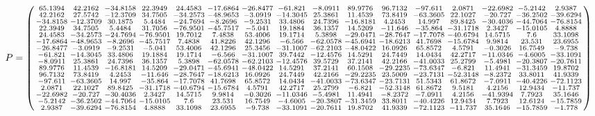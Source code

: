 \documentclass[fleqn]{article}
\begin{document}
$P = \spmqty{ 65.1394 & 42.2162 & -34.8158 & 22.3949 & 24.4583 & -17.6864 & -26.8477 & -61.821 & -8.0911 & 89.9776 & 96.7132 & -97.611 & 2.0871 & -22.6982 & -5.2142 & 2.9387 \\ 42.2162 & 27.5742 & -12.3709 & 34.7505 & -34.2573 & -48.9653 & -3.0919 & -14.3045 & 25.3861 & 11.4539 & 73.8419 & -63.3605 & 22.1027 & -20.727 & -36.2502 & -39.6294 \\ -34.8158 & -12.3709 & 30.1875 & 5.4484 & -24.7694 & -8.2696 & -9.2531 & 33.4806 & 24.7396 & -16.8181 & 4.2453 & 14.997 & 89.8425 & -30.4036 & -44.7064 & -76.8154 \\ 22.3949 & 34.7505 & 5.4484 & 31.7056 & -76.9501 & -45.7517 & -5.041 & 19.1884 & 36.1357 & 14.5209 & -11.646 & -35.864 & -31.1718 & 2.3427 & -15.0105 & 4.8888 \\ 24.4583 & -34.2573 & -24.7694 & -76.9501 & 19.7012 & 7.4838 & 53.4006 & 19.1714 & 5.3898 & -29.0471 & -28.7647 & -17.7078 & -40.6794 & 14.5715 & 7.6 & 33.1098 \\ -17.6864 & -48.9653 & -8.2696 & -45.7517 & 7.4838 & 41.8226 & 42.1296 & -6.566 & -62.0578 & -45.6941 & -18.6213 & 41.7698 & -15.6784 & 9.9814 & 23.531 & 23.6955 \\ -26.8477 & -3.0919 & -9.2531 & -5.041 & 53.4006 & 42.1296 & 25.3456 & -31.1007 & -62.2103 & -48.0422 & 16.0926 & 65.8572 & 4.5791 & -0.3026 & 16.7549 & -9.738 \\ -61.821 & -14.3045 & 33.4806 & 19.1884 & 19.1714 & -6.566 & -31.1007 & 39.7442 & -12.4576 & 14.5291 & 24.7449 & 14.0434 & 42.2717 & -11.0346 & -4.6005 & -33.1091 \\ -8.0911 & 25.3861 & 24.7396 & 36.1357 & 5.3898 & -62.0578 & -62.2103 & -12.4576 & 39.5729 & 37.2141 & 42.2166 & -41.0033 & 25.2799 & -5.4981 & -20.3807 & -20.7611 \\ 89.9776 & 11.4539 & -16.8181 & 14.5209 & -29.0471 & -45.6941 & -48.0422 & 14.5291 & 37.2141 & 60.1508 & -29.2235 & -73.6347 & -6.821 & 11.4941 & -31.3459 & 19.8702 \\ 96.7132 & 73.8419 & 4.2453 & -11.646 & -28.7647 & -18.6213 & 16.0926 & 24.7449 & 42.2166 & -29.2235 & 23.5009 & -23.7131 & -52.3148 & -8.2372 & 33.8011 & 41.9339 \\ -97.611 & -63.3605 & 14.997 & -35.864 & -17.7078 & 41.7698 & 65.8572 & 14.0434 & -41.0033 & -73.6347 & -23.7131 & 51.5343 & 61.8672 & -7.0911 & -40.4226 & -72.1123 \\ 2.0871 & 22.1027 & 89.8425 & -31.1718 & -40.6794 & -15.6784 & 4.5791 & 42.2717 & 25.2799 & -6.821 & -52.3148 & 61.8672 & 9.5181 & 4.2156 & 12.9434 & -11.737 \\ -22.6982 & -20.727 & -30.4036 & 2.3427 & 14.5715 & 9.9814 & -0.3026 & -11.0346 & -5.4981 & 11.4941 & -8.2372 & -7.0911 & 4.2156 & -41.9394 & 7.7923 & 35.1646 \\ -5.2142 & -36.2502 & -44.7064 & -15.0105 & 7.6 & 23.531 & 16.7549 & -4.6005 & -20.3807 & -31.3459 & 33.8011 & -40.4226 & 12.9434 & 7.7923 & 12.6124 & -15.7859 \\ 2.9387 & -39.6294 & -76.8154 & 4.8888 & 33.1098 & 23.6955 & -9.738 & -33.1091 & -20.7611 & 19.8702 & 41.9339 & -72.1123 & -11.737 & 35.1646 & -15.7859 & -1.778 }$
\end{document}
